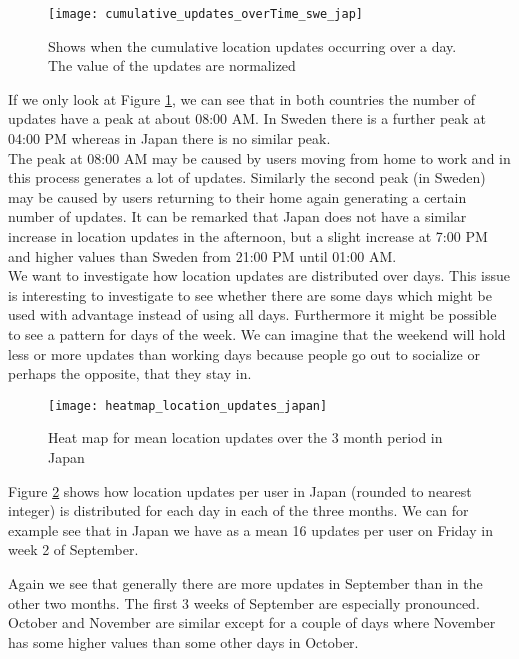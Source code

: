 \begin{figure}[H]
    \hspace*{-1.8cm}
    \centering
    \texttt{[image: cumulative\_updates\_overTime\_swe\_jap]}
    \caption{Shows when the cumulative location updates occurring over a day. The value of the updates are normalized}
    \label{fig:cumu_loc_time_jap_swe}
\end{figure}

If we only look at Figure \ref{fig:cumu_loc_time_jap_swe}, we can see that in both countries the number of updates have a peak at about 08:00 AM. In Sweden there is a further peak at 04:00 PM whereas in Japan there is no similar peak. \\
The peak at 08:00 AM may be caused by users moving from home to work and in this process generates a lot of updates. Similarly the second peak (in Sweden) may be caused by users returning to their home again generating a certain number of updates. It can be remarked that Japan does not have a similar increase in location updates in the afternoon, but a slight increase at 7:00 PM and higher values than Sweden from 21:00 PM until 01:00 AM. \\


We want to investigate how location updates are distributed over days. This issue is interesting to investigate to see whether there are some days which might be used with advantage instead of using all days. Furthermore it might be possible to see a pattern for days of the week. We can imagine that the weekend will hold less or more updates than working days because people go out to socialize or perhaps the opposite, that they stay in.


\begin{figure}[H]
    \hspace*{-1.5cm}
    \centering
    \texttt{[image: heatmap\_location\_updates\_japan]}
    \caption{Heat map for mean location updates over the 3 month period in Japan}
    \label{fig:heatmap_jap}
\end{figure}

Figure \ref{fig:heatmap_jap} shows how location updates per user in Japan (rounded to nearest integer) is distributed for each day in each of the three months. We can for example see that in Japan we have as a mean 16 updates per user on Friday in week 2 of September.  

Again we see that generally there are more updates in September than in the other two months. The first 3 weeks of September are especially pronounced. October and November are similar except for a couple of days where November has some higher values than some other days in October.

